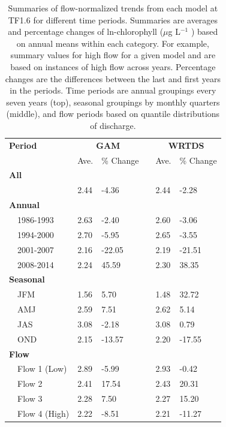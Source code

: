 \documentclass[letterpaper,12pt,oneside]{article}\usepackage[]{graphicx}\usepackage[]{color}
\newcommand{\mugl}{$\mu$g L$^{-1}$ }
\begin{document}
\begin{table}[!tbp]
\caption{Summaries of flow-normalized trends from each model at TF1.6 for different time periods.  Summaries are averages and percentage changes of ln-chlorophyll (\mugl) based on annual means within each category.  For example, summary values for high flow for a given model and are based on instances of high flow across years.  Percentage changes are the differences between the last and first years in the periods.  Time periods are annual groupings every seven years (top), seasonal groupings by monthly quarters (middle), and flow periods based on quantile distributions of discharge.\label{tab:trendsTF16}} 
\begin{center}
\begin{tabular}{lllcll}
\hline\hline
\multicolumn{1}{l}{\bfseries Period}&\multicolumn{2}{c}{\bfseries GAM}&\multicolumn{1}{c}{\bfseries }&\multicolumn{2}{c}{\bfseries WRTDS}\tabularnewline
\cline{2-3} \cline{5-6}
\multicolumn{1}{l}{}&\multicolumn{1}{c}{Ave.}&\multicolumn{1}{c}{\% Change}&\multicolumn{1}{c}{}&\multicolumn{1}{c}{Ave.}&\multicolumn{1}{c}{\% Change}\tabularnewline
\hline
{\bfseries All}&&&&&\tabularnewline
~~&2.44& -4.36&&2.44& -2.28\tabularnewline
\hline
{\bfseries Annual}&&&&&\tabularnewline
~~1986-1993&2.63& -2.40&&2.60& -3.06\tabularnewline
~~1994-2000&2.70& -5.95&&2.65& -3.55\tabularnewline
~~2001-2007&2.16&-22.05&&2.19&-21.51\tabularnewline
~~2008-2014&2.24& 45.59&&2.30& 38.35\tabularnewline
\hline
{\bfseries Seasonal}&&&&&\tabularnewline
~~JFM&1.56&  5.70&&1.48& 32.72\tabularnewline
~~AMJ&2.59&  7.51&&2.62&  5.14\tabularnewline
~~JAS&3.08& -2.18&&3.08&  0.79\tabularnewline
~~OND&2.15&-13.57&&2.20&-17.55\tabularnewline
\hline
{\bfseries Flow}&&&&&\tabularnewline
~~Flow 1 (Low)&2.89& -5.99&&2.93& -0.42\tabularnewline
~~Flow 2&2.41& 17.54&&2.43& 20.31\tabularnewline
~~Flow 3&2.28&  7.50&&2.27& 15.20\tabularnewline
~~Flow 4 (High)&2.22& -8.51&&2.21&-11.27\tabularnewline
\hline
\end{tabular}\end{center}

\end{table}
\end{document}
